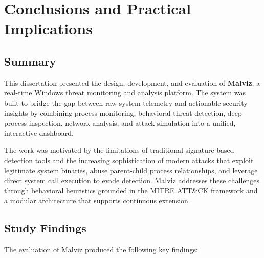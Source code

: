 
\chapter{Conclusions and Practical Implications}\doublespacing

\label{Chapter6}


\section{Summary}

This dissertation presented the design, development, and evaluation of \textbf{Malviz}, a real-time Windows threat monitoring and analysis platform. The system was built to bridge the gap between raw system telemetry and actionable security insights by combining process monitoring, behavioral threat detection, deep process inspection, network analysis, and attack simulation into a unified, interactive dashboard.

The work was motivated by the limitations of traditional signature-based detection tools and the increasing sophistication of modern attacks that exploit legitimate system binaries, abuse parent-child process relationships, and leverage direct system call execution to evade detection. Malviz addresses these challenges through behavioral heuristics grounded in the MITRE ATT\&CK framework and a modular architecture that supports continuous extension.

\section{Study Findings}

The evaluation of Malviz produced the following key findings:

